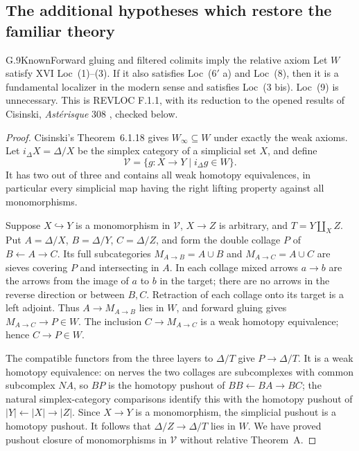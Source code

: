 \subsection{The additional hypotheses which restore the familiar theory}

\begin{claim}{G.9}{Known}{Forward gluing and filtered colimits imply the relative axiom}
\label{G:gluing-recovery}
Let $W$ satisfy XVI Loc~(1)--(3).  If it also satisfies
Loc~($6'$ a) and Loc~(8), then it is a fundamental localizer in the
modern sense and satisfies Loc~(3 bis).  Loc~(9) is unnecessary.
This is REVLOC F.1.1, with its reduction to the opened results of
Cisinski, \emph{Ast\'erisque} 308 \cite{GCisinski2006}, checked below.
\end{claim}
\begin{proof}
Cisinski's Theorem~6.1.18 gives $W_\infty\subseteq W$ under exactly
the weak axioms.  Let $i_\Delta X=\Delta/X$ be the simplex category
of a simplicial set $X$, and define
\[
 \mathcal V=\{g:X\to Y\mid i_\Delta g\in W\}.
\]
It has two out of three and contains all weak homotopy equivalences,
in particular every simplicial map having the right lifting property
against all monomorphisms.

Suppose $X\hookrightarrow Y$ is a monomorphism in $\mathcal V$,
$X\to Z$ is arbitrary, and $T=Y\amalg_X Z$.  Put
$A=\Delta/X$, $B=\Delta/Y$, $C=\Delta/Z$, and form the double
collage $P$ of $B\leftarrow A\to C$.  Its full subcategories
$M_{A\to B}=A\cup B$ and $M_{A\to C}=A\cup C$ are sieves
covering $P$ and intersecting in $A$.  In each collage mixed arrows
$a\to b$ are the arrows from the image of $a$ to $b$ in the target;
there are no arrows in the reverse direction or between $B,C$.
Retraction of each collage onto its target is a left adjoint.
Thus $A\to M_{A\to B}$ lies in $W$, and forward gluing gives
$M_{A\to C}\to P\in W$.  The inclusion $C\to M_{A\to C}$ is
a weak homotopy equivalence; hence $C\to P\in W$.

The compatible functors from the three layers to $\Delta/T$ give
$P\to\Delta/T$.  It is a weak homotopy equivalence: on nerves the
two collages are subcomplexes with common subcomplex $NA$, so $BP$
is the homotopy pushout of $BB\leftarrow BA\to BC$; the natural
simplex-category comparisons identify this with the homotopy pushout
of $|Y|\leftarrow|X|\to|Z|$.  Since $X\to Y$ is a monomorphism,
the simplicial pushout is a homotopy pushout.  It follows that
$\Delta/Z\to\Delta/T$ lies in $W$.  We have proved pushout closure
of monomorphisms in $\mathcal V$ without relative Theorem~A.


\end{proof}
